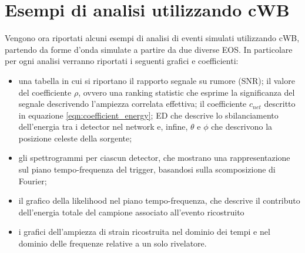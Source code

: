 \section{Esempi di analisi utilizzando cWB}
\label{section:examples}
Vengono ora riportati alcuni esempi di analisi di eventi simulati utilizzando cWB, partendo da forme d'onda simulate a partire da due diverse EOS. In particolare per ogni analisi verranno riportati i seguenti grafici e coefficienti:
\begin{itemize}
		\item una tabella in cui si riportano il rapporto segnale su rumore (SNR); il valore del coefficiente $\rho$, ovvero una ranking statistic che esprime la significanza del segnale descrivendo l'ampiezza correlata effettiva; il coefficiente $c_{net}$ descritto in equazione \ref{eqn:coefficient_energy}; ED che descrive lo sbilanciamento dell'energia tra i detector nel network e, infine, $\theta$ e $\phi$ che descrivono la posizione celeste della sorgente;
		\item gli spettrogrammi per ciascun detector, che mostrano una rappresentazione sul piano tempo-frequenza del trigger, basandosi sulla scomposizione di Fourier;
		\item il grafico della likelihood nel piano tempo-frequenza, che descrive il contributo dell'energia totale del campione associato all'evento ricostruito
		\item i grafici dell'ampiezza di strain ricostruita nel dominio dei tempi e nel dominio delle frequenze relative a un solo rivelatore.		
\end{itemize}
